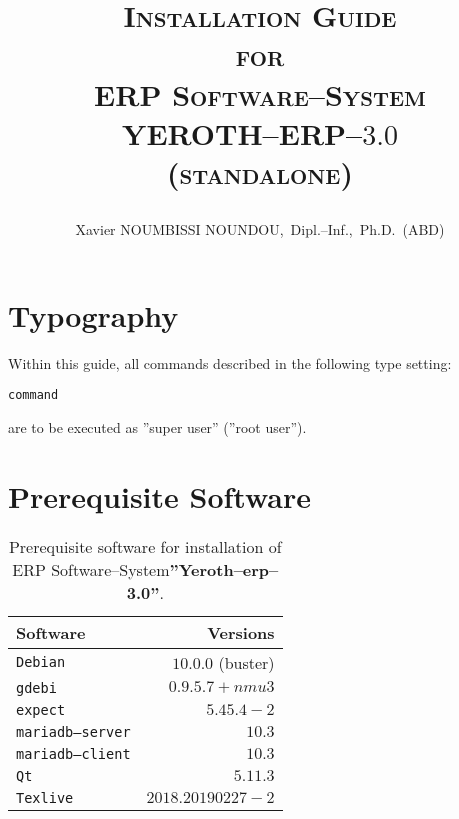 \documentclass[a4paper, 10pt]{article}
\newcommand{\yerotherptroiszero}{\textbf{''Yeroth--erp--3.0''}\xspace}
\newcommand{\texlive}{\texttt{Texlive}\xspace}
\newcommand{\gdebi}{\texttt{gdebi}\xspace}
\newcommand{\expect}{\texttt{expect}\xspace}
\newcommand{\debian}{\texttt{Debian}\xspace}
\newcommand{\qt}{\texttt{Qt}\xspace}
\newcommand{\mariadbserver}{\texttt{mariadb--server}\xspace}
\newcommand{\mariadbclient}{\texttt{mariadb--client}\xspace}
\newcommand{\yerotherp}{\textcolor{yerenColorBlue}{\sc YEROTH--ERP--$3.0$}\xspace}
\newcommand{\erp}{ERP Software--System\xspace}
\newcommand{\myfullacademicname}{Xavier NOUMBISSI NOUNDOU,~Dipl.--Inf.,~Ph.D.~(ABD)\xspace}
\newcommand{\rootcommand}[1]{
\begin{center}
\textcolor{purplish}{#1\xspace}
\end{center}}
\begin{document}

\title{
\vspace{-1.65em}
\textcolor{medgreen}{\textsc{Installation Guide\\
										for \\
									 \erp \\ \vspace{1em}
									 \yerotherp \\ 
									 \textcolor{yerenColorBlue}{(standalone)} }}
									 \author{\myfullacademicname}
}

\date{} 
\maketitle
\thispagestyle{fancy}


\vspace{0.25cm}

\section{Typography}

Within this guide, all commands described
in the following type setting:
	\begin{alltt}
		\rootcommand{command}
	\end{alltt}
are to be executed as ''super user'' (''root user'').

\section{Prerequisite Software}

\begin{table}[!htbp]
\centering
\begin{tabular}{l|r}
\textbf{Software}	&
\textbf{Versions}	\\ \hline
\debian				&
$10.0.0$ (buster)	\\ \hline
\gdebi				&
$0.9.5.7+nmu3$		\\ \hline
\expect				&
$5.45.4-2$			\\ \hline
\mariadbserver		&
$10.3$				\\ \hline
\mariadbclient		&
$10.3$				\\ \hline
\qt					&
$5.11.3$			\\ \hline	
\texlive			&
$2018.20190227-2$	\\
\end{tabular}
\caption{Prerequisite software for installation of
	 \erp \yerotherptroiszero.}
\label{tab:prerequisite-software}
\end{table}
\end{document}
